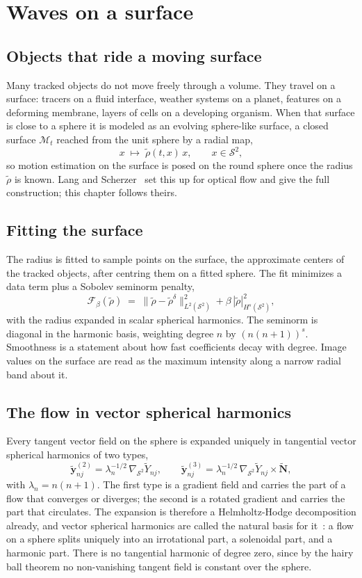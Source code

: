 \chapter{Waves on a surface}

\section{Objects that ride a moving surface}

Many tracked objects do not move freely through a volume. They travel on a surface: tracers on a
fluid interface, weather systems on a planet, features on a deforming membrane, layers of cells on a
developing organism. When that surface is close to a sphere it is modeled as an evolving sphere-like
surface, a closed surface \(\mathcal{M}_t\) reached from the unit sphere by a radial map,
\[
x \;\mapsto\; \tilde\rho(t, x)\, x, \qquad x \in \mathcal{S}^2,
\]
so motion estimation on the surface is posed on the round sphere once the radius \(\tilde\rho\) is
known. Lang and Scherzer~\cite{src:Lang-and-Scherzer-2015} set this up for optical flow and give the full construction; this chapter
follows theirs.

\section{Fitting the surface}

The radius is fitted to sample points on the surface, the approximate centers of the tracked
objects, after centring them on a fitted sphere. The fit minimizes a data term plus a Sobolev
seminorm penalty,
\[
\mathcal{F}_\beta(\tilde\rho) \;=\; \|\tilde\rho - \tilde\rho^{\delta}\|^2_{L^2(\mathcal{S}^2)}
+ \beta\, |\tilde\rho|^2_{H^s(\mathcal{S}^2)},
\]
with the radius expanded in scalar spherical harmonics. The seminorm is diagonal in the harmonic
basis, weighting degree \(n\) by \((n(n+1))^s\). Smoothness is a statement about how fast coefficients
decay with degree. Image values on the surface are read as the maximum intensity along a narrow
radial band about it.

\section{The flow in vector spherical harmonics}

Every tangent vector field on the sphere is expanded uniquely in tangential vector spherical
harmonics of two types,
\[
\tilde{\mathbf{y}}^{(2)}_{nj} = \lambda_n^{-1/2}\, \nabla_{\mathcal{S}^2} \tilde Y_{nj}, \qquad
\tilde{\mathbf{y}}^{(3)}_{nj} = \lambda_n^{-1/2}\, \nabla_{\mathcal{S}^2} \tilde Y_{nj} \times \tilde{\mathbf{N}},
\]
with \(\lambda_n = n(n+1)\). The first type is a gradient field and carries the part of a flow that
converges or diverges; the second is a rotated gradient and carries the part that circulates. The
expansion is therefore a Helmholtz-Hodge decomposition already, and vector spherical
harmonics are called the natural basis for it~\cite{src:arXiv-1809-04555}: a flow on a sphere splits uniquely into an
irrotational part, a solenoidal part, and a harmonic part. There is no tangential harmonic of degree
zero, since by the hairy ball theorem no non-vanishing tangent field is constant over the sphere.

